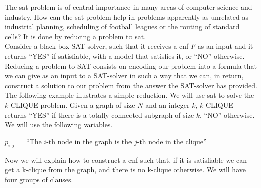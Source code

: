 The \gls{sat} problem is of central importance in many areas of computer science and industry. How can the \gls{sat} problem help in problems apparently as unrelated as industrial planning, scheduling of football leagues or the routing of standard cells? It is done by reducing a problem to \gls{sat}. \\

Consider a black-box SAT-solver, such that it receives a \gls{cnf} $F$ as an input and it returns ``YES'' if satisfiable, with a model that satisfies it, or ``NO'' otherwise. Reducing a problem to SAT consists on encoding our problem into a formula that we can give as an input to a SAT-solver in such a way that we can, in return, construct a solution to our problem from the answer the SAT-solver has provided. \\

The following example illustrates a simple reduction. We will use \gls{sat} to solve the $k$-CLIQUE problem. Given a graph of size $N$ and an integer $k$, $k$-CLIQUE returns ``YES'' if there is a totally connected subgraph of size $k$, ``NO'' otherwise. We will use the following variables.

\begin{center}$p_{i,j} =$ ``The $i$-th node in the graph is the $j$-th node in the clique''\end{center} 

Now we will explain how to construct a \gls{cnf} such that, if it is satisfiable we can get a k-clique from the graph, and there is no k-clique otherwise. We will have four groups of clauses.

